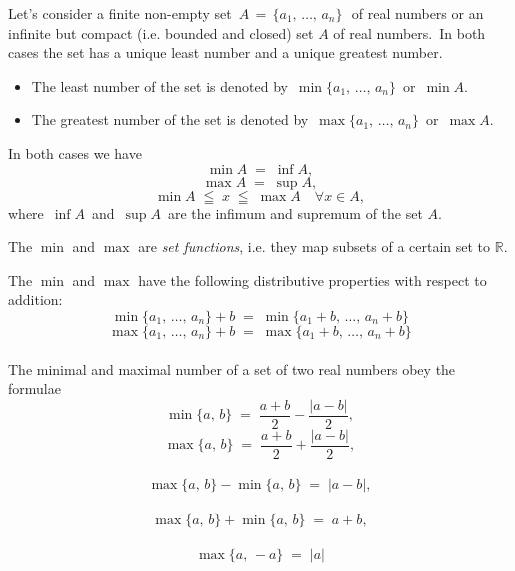 \documentclass[12pt]{article}
\begin{document}
Let's consider a finite non-empty set\, 
$A \,=\, \{a_1,\,\ldots,\,a_n\}$\,\, of real numbers or an infinite but compact (i.e. bounded and closed) set $A$ of real numbers.\, In both cases the set has a unique least number and a unique greatest number.
\begin{itemize}
 \item The least number of the set is denoted by\, 
 $\min\{a_1,\,\ldots,\,a_n\}$\, or\, $\min{A}$.
 \item The greatest number of the set is denoted by\, $\max\{a_1,\,\ldots,\,a_n\}$\, or\, $\max{A}$.
\end{itemize}

In both cases we have
$$\min{A} \;=\; \inf{A},$$
$$\max{A} \;=\; \sup{A},$$
$$\min{A} \;\leqq\; x \;\leqq\; \max{A} \quad \forall x\in A,$$
where\, $\inf{A}$\, and\, $\sup{A}$\, are the infimum and supremum of the set $A$.

The $\min$ and $\max$ are {\em set functions}, i.e. they map 
subsets of a certain set to $\mathbb{R}$.

The $\min$ and $\max$ have the following distributive properties 
with respect to addition:
$$\min\{a_1,\,\ldots,\,a_n\}+b 
\;=\; \min\{a_1+b,\,\ldots,\,a_n+b\}$$
$$\max\{a_1,\,\ldots,\,a_n\}+b 
\;=\; \max\{a_1+b,\,\ldots,\,a_n+b\}$$\\

The minimal and maximal number of a set of two real numbers obey 
the formulae
$$\min\{a,\,b\} \;=\; \frac{a\!+\!b}{2}\!-\!\frac{|a\!-\!b|}{2},$$
$$\max\{a,\,b\} \;=\; \frac{a\!+\!b}{2}\!+\!\frac{|a\!-\!b|}{2},$$\
$$\max\{a,\,b\}-\min\{a,\,b\} \;=\; |a\!-\!b|,$$\
$$\max\{a,\,b\}+\min\{a,\,b\} \;=\; a\!+\!b,$$\
$$\max\{a,\,-a\} \;=\; |a|$$

\end{document}

